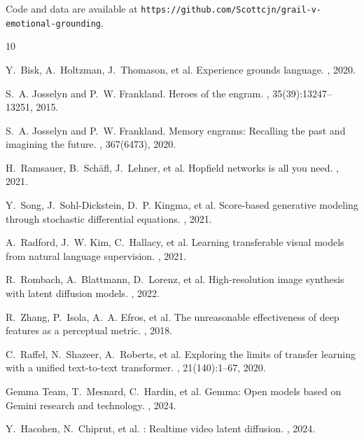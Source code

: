 \documentclass[10pt,twocolumn,letterpaper]{article}
\begin{document}
Code and data are available at \texttt{https://github.com/Scottcjn/grail-v-emotional-grounding}.

{\small

\makeatletter{}\makeatother
\begin{thebibliography}{10}

Y.~Bisk, A.~Holtzman, J.~Thomason, et al.
\newblock Experience grounds language.
, 2020.

S.~A. Josselyn and P.~W. Frankland.
\newblock Heroes of the engram.
, 35(39):13247--13251, 2015.

S.~A. Josselyn and P.~W. Frankland.
\newblock Memory engrams: Recalling the past and imagining the future.
, 367(6473), 2020.

H.~Ramsauer, B.~Sch{\"a}fl, J.~Lehner, et al.
\newblock Hopfield networks is all you need.
, 2021.

Y.~Song, J.~Sohl-Dickstein, D.~P. Kingma, et al.
\newblock Score-based generative modeling through stochastic differential equations.
, 2021.

A.~Radford, J.~W. Kim, C.~Hallacy, et al.
\newblock Learning transferable visual models from natural language supervision.
, 2021.

R.~Rombach, A.~Blattmann, D.~Lorenz, et al.
\newblock High-resolution image synthesis with latent diffusion models.
, 2022.

R.~Zhang, P.~Isola, A.~A. Efros, et al.
\newblock The unreasonable effectiveness of deep features as a perceptual metric.
, 2018.

C.~Raffel, N.~Shazeer, A.~Roberts, et al.
\newblock Exploring the limits of transfer learning with a unified text-to-text transformer.
, 21(140):1--67, 2020.

Gemma Team, T.~Mesnard, C.~Hardin, et al.
\newblock Gemma: Open models based on {Gemini} research and technology.
, 2024.

Y.~Hacohen, N.~Chiprut, et al.
: Realtime video latent diffusion.
, 2024.


\end{thebibliography}}
\end{document}
